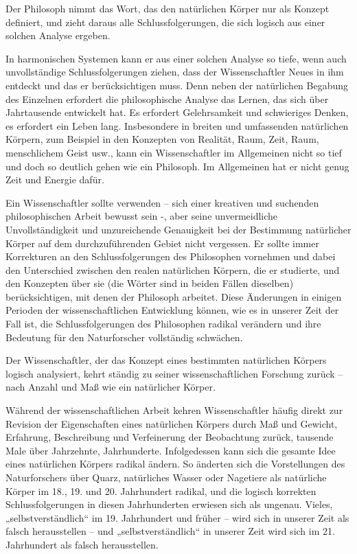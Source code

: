 \documentclass[11pt,a4paper]{book}
\begin{document}
Der Philosoph nimmt das Wort, das den natürlichen Körper nur als Konzept definiert, und zieht daraus alle Schlussfolgerungen, die sich logisch aus einer solchen Analyse ergeben.



In harmonischen Systemen kann er aus einer solchen Analyse so tiefe, wenn auch unvollständige Schlussfolgerungen ziehen, dass der Wissenschaftler Neues in ihm entdeckt und das er berücksichtigen muss. Denn neben der natürlichen Begabung des Einzelnen erfordert die philosophische Analyse das Lernen, das sich über Jahrtausende entwickelt hat. Es erfordert Gelehrsamkeit und schwieriges Denken, es erfordert ein Leben lang. Insbesondere in breiten und umfassenden natürlichen Körpern, zum Beispiel in den Konzepten von Realität, Raum, Zeit, Raum, menschlichem Geist usw., kann ein Wissenschaftler im Allgemeinen nicht so tief und doch so deutlich gehen wie ein Philosoph. Im Allgemeinen hat er nicht genug Zeit und Energie dafür.



Ein Wissenschaftler sollte verwenden -- sich einer kreativen und suchenden philosophischen Arbeit bewusst sein -, aber seine unvermeidliche Unvollständigkeit und unzureichende Genauigkeit bei der Bestimmung natürlicher Körper auf dem durchzuführenden Gebiet nicht vergessen. Er sollte immer Korrekturen an den Schlussfolgerungen des Philosophen vornehmen und dabei den Unterschied zwischen den realen natürlichen Körpern, die er studierte, und den Konzepten über sie (die Wörter sind in beiden Fällen dieselben) berücksichtigen, mit denen der Philosoph arbeitet. Diese Änderungen in einigen Perioden der wissenschaftlichen Entwicklung können, wie es in unserer Zeit der Fall ist, die Schlussfolgerungen des Philosophen radikal verändern und ihre Bedeutung für den Naturforscher vollständig schwächen.



Der Wissenschaftler, der das Konzept eines bestimmten natürlichen Körpers logisch analysiert, kehrt ständig zu seiner wissenschaftlichen Forschung zurück -- nach Anzahl und Maß wie ein natürlicher Körper.



Während der wissenschaftlichen Arbeit kehren Wissenschaftler häufig direkt zur Revision der Eigenschaften eines natürlichen Körpers durch Maß und Gewicht, Erfahrung, Beschreibung und Verfeinerung der Beobachtung zurück, tausende Male über Jahrzehnte, Jahrhunderte. Infolgedessen kann sich die gesamte Idee eines natürlichen Körpers radikal ändern. So änderten sich die Vorstellungen des Naturforschers über Quarz, natürliches Wasser oder Nagetiere als natürliche Körper im 18., 19. und 20. Jahrhundert radikal, und die logisch korrekten Schlussfolgerungen in diesen Jahrhunderten erwiesen sich als ungenau. Vieles, „selbstverständlich“ im 19. Jahrhundert und früher -- wird sich in unserer Zeit als falsch herausstellen -- und „selbstverständlich“ in unserer Zeit wird sich im 21. Jahrhundert als falsch herausstellen.
\end{document}
